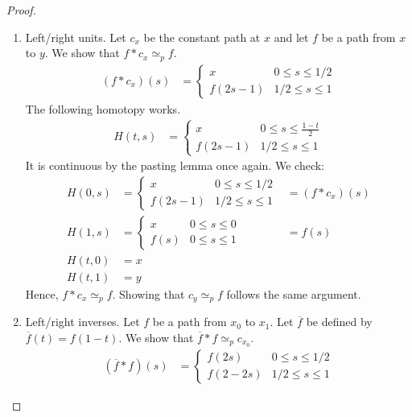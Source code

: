 \begin{proof}
\begin{enumerate}
    \item Left/right units.
      Let \( c_x \) be the constant path at \( x \) and
      let \( f \) be a path from \( x \) to \( y \).
      We show that \( f * c_x \simeq_p f \).
      \begin{align}
        (f * c_x)(s) &= \begin{cases}
          x & 0 \le s \le 1/2 \\
          f(2s - 1) & 1/2 \le s \le 1
        \end{cases}
      \end{align}
      The following homotopy works.
      \begin{align}
        H(t, s) &= \begin{cases}
          x & 0 \le s \le \frac{1 - t}{2} \\
          f(2s - 1) & 1/2 \le s \le 1
        \end{cases}
      \end{align}
      It is continuous by the pasting lemma once again.
      We check:
      \begin{align}
        H(0, s) &= \begin{cases}
          x & 0 \le s \le 1/2 \\
          f(2s - 1) & 1/2 \le s \le 1
        \end{cases}
                &= \left(f * c_x\right)(s) \\
          H(1, s) &= \begin{cases}
            x & 0 \le s \le 0 \\
            f(s) & 0 \le s \le 1
          \end{cases}
                  &= f(s) \\
            H(t, 0) &= x\\
            H(t, 1) &= y
      \end{align}
      Hence, \( f * c_x \simeq_p f \).
      Showing that \( c_y \simeq_p f \) follows the same argument.
    \item Left/right inverses.
      Let \( f \) be a path from \( x_0  \) to \( x_1 \).
      Let \( \overline{f} \) be defined by
      \( \overline{f}(t) = f(1-t) \).
      We show that \( \overline{f} * f \simeq_p c_{x_0} \).
      \begin{align}
          (\overline{f} * f)(s) &= \begin{cases}
            f(2s) & 0 \le s \le 1/2 \\
            f(2 - 2s) & 1/2 \le s \le 1
        \end{cases}

\end{align}
\end{enumerate}
\end{proof}
